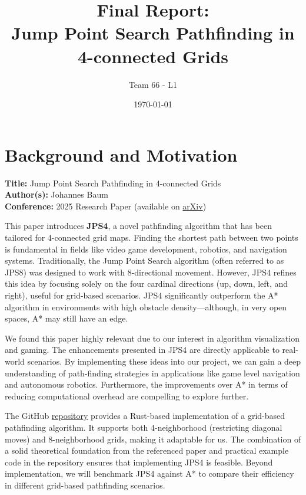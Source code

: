 \documentclass[11pt]{article}
\title{Final Report:\\ \textbf{Jump Point Search Pathfinding in 4-connected Grids}}
\author{Team 66 - L1}
\date{\today}
\begin{document}
\maketitle

\section{Background and Motivation}
\textbf{Title: } Jump Point Search Pathfinding in 4-connected Grids \\
\textbf{Author(s): } Johannes Baum \\
\textbf{Conference: } 2025 Research Paper (available on \href{https://arxiv.org/abs/2501.14816v1}{arXiv})

This paper introduces \textbf{JPS4}, a novel pathfinding algorithm that has been tailored for 4-connected grid maps. Finding the shortest path between two points is fundamental in fields like video game development, robotics, and navigation systems. Traditionally, the Jump Point Search algorithm (often referred to as JPS8) was designed to work with 8-directional movement. However, JPS4 refines this idea by focusing solely on the four cardinal directions (up, down, left, and right), useful for grid-based scenarios. JPS4 significantly outperform the A* algorithm in environments with high obstacle density—although, in very open spaces, A* may still have an edge.

We found this paper highly relevant due to our interest in algorithm visualization and gaming. The enhancements presented in JPS4 are directly applicable to real-world scenarios. By implementing these ideas into our project, we can gain a deep understanding of path-finding strategies in applications like game level navigation and autonomous robotics. Furthermore, the improvements over A* in terms of reducing computational overhead are compelling to explore further.

The GitHub \href{https://github.com/tbvanderwoude/grid_pathfinding}{repository} provides a Rust-based implementation of a grid-based pathfinding algorithm. It supports both 4-neighborhood (restricting diagonal moves) and 8-neighborhood grids, making it adaptable for us. The combination of a solid theoretical foundation from the referenced paper and practical example code in the repository ensures that implementing JPS4 is feasible. Beyond implementation, we will benchmark JPS4 against A* to compare their efficiency in different grid-based pathfinding scenarios.
\end{document}
